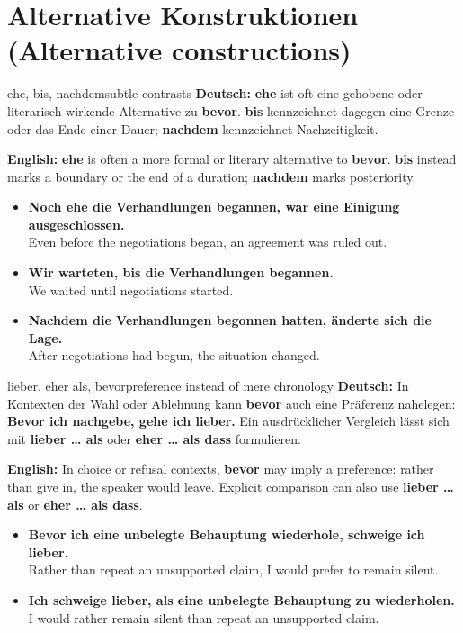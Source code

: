 \documentclass[a4paper,11pt]{article}
\newcommand{\GermanText}[1]{\textbf{Deutsch: }#1\par}
\newcommand{\EnglishText}[1]{{\small\color{SoftGray}\textbf{English: }#1\par}}
\newcommand{\ExampleItem}[2]{\item \textbf{#1}\\{\small\color{SoftGray}#2}}
\begin{document}
    \section{Alternative Konstruktionen (Alternative constructions)}
        \begin{grammarentry}{ehe, bis, nachdem}{subtle contrasts}
            \GermanText{\textbf{ehe} ist oft eine gehobene oder literarisch wirkende Alternative zu \textbf{bevor}. \textbf{bis} kennzeichnet dagegen eine Grenze oder das Ende einer Dauer; \textbf{nachdem} kennzeichnet Nachzeitigkeit.}
            \EnglishText{\textbf{ehe} is often a more formal or literary alternative to \textbf{bevor}. \textbf{bis} instead marks a boundary or the end of a duration; \textbf{nachdem} marks posteriority.}
        \end{grammarentry}
        \begin{exbox}
            \begin{itemize}
                \ExampleItem{Noch ehe die Verhandlungen begannen, war eine Einigung ausgeschlossen.}{Even before the negotiations began, an agreement was ruled out.}
                \ExampleItem{Wir warteten, bis die Verhandlungen begannen.}{We waited until negotiations started.}
                \ExampleItem{Nachdem die Verhandlungen begonnen hatten, änderte sich die Lage.}{After negotiations had begun, the situation changed.}
            \end{itemize}
        \end{exbox}
        \begin{grammarentry}{lieber, eher als, bevor}{preference instead of mere chronology}
            \GermanText{In Kontexten der Wahl oder Ablehnung kann \textbf{bevor} auch eine Präferenz nahelegen: \textbf{Bevor ich nachgebe, gehe ich lieber.} Ein ausdrücklicher Vergleich lässt sich mit \textbf{lieber \ldots{} als} oder \textbf{eher \ldots{} als dass} formulieren.}
            \EnglishText{In choice or refusal contexts, \textbf{bevor} may imply a preference: rather than give in, the speaker would leave. Explicit comparison can also use \textbf{lieber \ldots{} als} or \textbf{eher \ldots{} als dass}.}
        \end{grammarentry}
        \begin{exbox}
            \begin{itemize}
                \ExampleItem{Bevor ich eine unbelegte Behauptung wiederhole, schweige ich lieber.}{Rather than repeat an unsupported claim, I would prefer to remain silent.}
                \ExampleItem{Ich schweige lieber, als eine unbelegte Behauptung zu wiederholen.}{I would rather remain silent than repeat an unsupported claim.}
            \end{itemize}
        \end{exbox}
\end{document}
